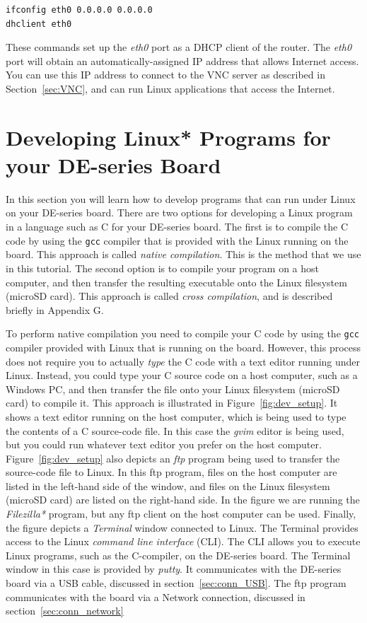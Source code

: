 \documentclass[11pt, twoside, pdftex]{article}
\begin{document}
\begin{lstlisting}
ifconfig eth0 0.0.0.0 0.0.0.0
dhclient eth0
\end{lstlisting}
These commands set up the {\it eth0} port as a DHCP client of the router. The {\it eth0} port will
obtain an automatically-assigned IP address that allows Internet access. You can use this 
IP address to connect to the VNC server as described in Section~\ref{sec:VNC}, and can run
Linux applications that access the Internet.

\section{Developing Linux* Programs for your DE-series Board}
\label{sec:linux_programs}

In this section you will learn how to develop programs that can run under Linux on 
your DE-series board. There are two options for developing a Linux program in a language such
as C for your DE-series board. The first is to compile the C code by using the \texttt{gcc}
compiler that is provided with the Linux running on the board. This approach is called 
\textit{native compilation}. This is the method that we use in this tutorial. The second option is 
to compile your program on a host computer, and then transfer the resulting executable onto 
the Linux filesystem (microSD card). This approach is called \textit{cross compilation}, and 
is described briefly in Appendix G.

To perform native compilation you need to compile your C code by using the \texttt{gcc} compiler 
provided with Linux that is running on the board. However, this process does not require you to
actually {\it type} the C code with a text editor running under Linux. Instead, you could type
your C source code on a host computer, such as a Windows PC, and then transfer the file
onto your Linux filesystem (microSD card) to compile it. This approach is illustrated in 
Figure~\ref{fig:dev_setup}. It shows a text editor running on the host computer, which is being
used to type the contents of a C source-code file. In this case the {\it gvim} editor is
being used, but you could run whatever text editor you prefer on the host computer. 
Figure~\ref{fig:dev_setup} also depicts an {\it ftp} program being used to transfer the
source-code file to Linux. In this ftp program, files on the host computer are listed in the 
left-hand side of the window, and files on the Linux filesystem (microSD card) are listed on
the right-hand side. In the figure we are running the {\it Filezilla*} program, but any 
ftp client on the host computer can be used. Finally, the figure depicts a {\it Terminal} 
window connected to Linux. The Terminal provides access to the Linux 
{\it command line interface} (CLI). The CLI allows you to execute Linux programs, such 
as the C-compiler, on the DE-series board. The Terminal window in this case is provided 
by {\it putty}. It communicates with the DE-series board via a USB cable, discussed in 
section~\ref{sec:conn_USB}. The ftp program communicates with the board
via a Network connection, discussed in section~\ref{sec:conn_network}
\end{document}
